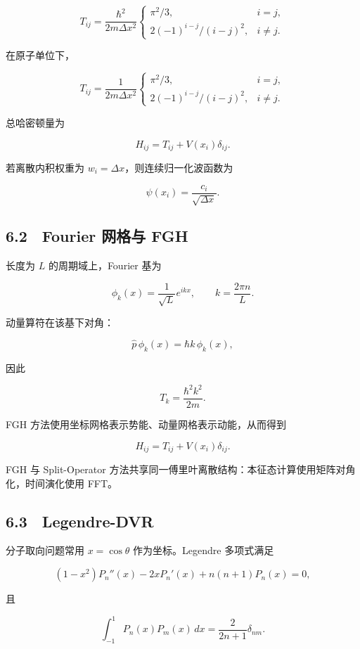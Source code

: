 \documentclass[
  a4paper,
]{ctexbook}
\begin{document}
\[
T_{ij}
=
\frac{\hbar^2}{2m\Delta x^2}
\begin{cases}
\pi^2/3, & i=j,\\[4pt]
2(-1)^{i-j}/(i-j)^2, & i\ne j.
\end{cases}
\]

在原子单位下，

\[
T_{ij}
=
\frac{1}{2m\Delta x^2}
\begin{cases}
\pi^2/3, & i=j,\\[4pt]
2(-1)^{i-j}/(i-j)^2, & i\ne j.
\end{cases}
\]

总哈密顿量为

\[
H_{ij}
=
T_{ij}
+
V(x_i)\delta_{ij}.
\]

若离散内积权重为 \(w_i=\Delta x\)，则连续归一化波函数为

\[
\psi(x_i)=\frac{c_i}{\sqrt{\Delta x}}.
\]

\hypertarget{fourier-ux7f51ux683cux4e0e-fgh}{%
\subsection{6.2　Fourier 网格与
FGH}\label{fourier-ux7f51ux683cux4e0e-fgh}}

长度为 \(L\) 的周期域上，Fourier 基为

\[
\phi_k(x)
=
\frac{1}{\sqrt L}e^{ikx},
\qquad
k=\frac{2\pi n}{L}.
\]

动量算符在该基下对角：

\[
\hat p\,\phi_k(x)=\hbar k\,\phi_k(x),
\]

因此

\[
T_k=\frac{\hbar^2k^2}{2m}.
\]

FGH 方法使用坐标网格表示势能、动量网格表示动能，从而得到

\[
H_{ij}
=
T_{ij}
+
V(x_i)\delta_{ij}.
\]

FGH 与 Split-Operator
方法共享同一傅里叶离散结构：本征态计算使用矩阵对角化，时间演化使用 FFT。

\hypertarget{legendre-dvr}{%
\subsection{6.3　Legendre-DVR}\label{legendre-dvr}}

分子取向问题常用 \(x=\cos\theta\) 作为坐标。Legendre 多项式满足

\[
(1-x^2)P_n''(x)-2xP_n'(x)+n(n+1)P_n(x)=0,
\]

且

\[
\int_{-1}^{1}P_n(x)P_m(x)\,dx
=
\frac{2}{2n+1}\delta_{nm}.
\]
\end{document}
